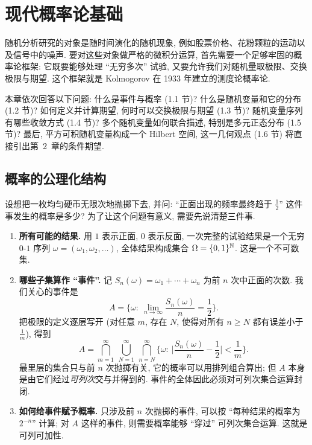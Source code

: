 \chapter{现代概率论基础}
\label{ch:1}

随机分析研究的对象是随时间演化的随机现象, 例如股票价格、花粉颗粒的运动以及信号中的噪声. 要对这些对象做严格的微积分运算, 首先需要一个足够牢固的概率论框架: 它既要能够处理 ``无穷多次'' 试验, 又要允许我们对随机量取极限、交换极限与期望. 这个框架就是 Kolmogorov 在 1933 年建立的测度论概率论.

本章依次回答以下问题: 什么是事件与概率 (1.1 节)? 什么是随机变量和它的分布 (1.2 节)? 如何定义并计算期望, 何时可以交换极限与期望 (1.3 节)? 随机变量序列有哪些收敛方式 (1.4 节)? 多个随机变量如何联合描述, 特别是多元正态分布 (1.5 节)? 最后, 平方可积随机变量构成一个 Hilbert 空间, 这一几何观点 (1.6 节) 将直接引出第~2~章的条件期望.

\section{概率的公理化结构}
\label{sec:1-1}

设想把一枚均匀硬币无限次地抛掷下去, 并问: ``正面出现的频率最终趋于 $\frac{1}{2}$'' 这件事发生的概率是多少? 为了让这个问题有意义, 需要先说清楚三件事.

\begin{enumerate}
\item \textbf{所有可能的结果.} 用 $1$ 表示正面, $0$ 表示反面, 一次完整的试验结果是一个无穷 $0$-$1$ 序列 $\omega=(\omega_1,\omega_2,\dots)$, 全体结果构成集合 $\Omega=\{0,1\}^{\mathbb{N}}$. 这是一个不可数集.
\item \textbf{哪些子集算作 ``事件''.} 记 $S_n(\omega)=\omega_1+\cdots+\omega_n$ 为前 $n$ 次中正面的次数. 我们关心的事件是
\[
A=\Big\{\omega:\ \lim_{n\to\infty}\frac{S_n(\omega)}{n}=\frac{1}{2}\Big\}.
\]
把极限的定义逐层写开 (对任意 $m$, 存在 $N$, 使得对所有 $n\ge N$ 都有误差小于 $\frac{1}{m}$), 得到
\begin{equation}\label{eq:1-freq-event}
A=\bigcap_{m=1}^{\infty}\ \bigcup_{N=1}^{\infty}\ \bigcap_{n=N}^{\infty}\Big\{\omega:\ \Big|\frac{S_n(\omega)}{n}-\frac{1}{2}\Big|<\frac{1}{m}\Big\}.
\end{equation}
最里层的集合只与前 $n$ 次抛掷有关, 它的概率可以用排列组合算出; 但 $A$ 本身是由它们经过\emph{可列次}交与并得到的. 事件的全体因此必须对可列次集合运算封闭.
\item \textbf{如何给事件赋予概率.} 只涉及前 $n$ 次抛掷的事件, 可以按 ``每种结果的概率为 $2^{-n}$'' 计算; 对 $A$ 这样的事件, 则需要概率能够 ``穿过'' 可列次集合运算. 这就是可列可加性.
\end{enumerate}

